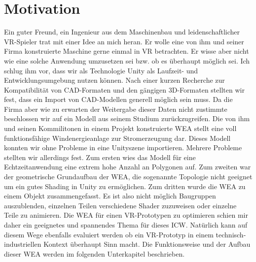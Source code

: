 \section{Motivation}
\label{sec:Motivation}
Ein guter Freund, ein Ingenieur aus dem Maschinenbau und leidenschaftlicher VR-Spieler trat mit einer Idee an mich heran. Er wolle eine von ihm und seiner Firma konstruierte Maschine gerne einmal in VR betrachten. Er wisse aber nicht wie eine solche Anwendung umzusetzen sei bzw. ob es überhaupt möglich sei. Ich schlug ihm vor, dass wir als Technologie Unity als Laufzeit- und Entwicklungsumgebung nutzen können. Nach einer kurzen Recherche  zur Kompatibilität von CAD-Formaten und den gängigen 3D-Formaten stellten wir fest, dass ein Import von CAD-Modellen generell möglich sein muss. Da die Firma aber wie zu erwarten der Weitergabe dieser Daten nicht zustimmte beschlossen wir auf ein Modell aus seinem Studium zurückzugreifen. Die von ihm und seinen Kommilitonen in einem Projekt konstruierte WEA stellt eine voll funktionsfähige Windenergieanlage zur Stromerzeugung dar. Dieses Modell konnten wir ohne Probleme in eine Unityszene importieren. Mehrere Probleme stellten wir allerdings fest. Zum ersten wies das Modell für eine Echtzeitanwendung eine extrem hohe  Anzahl an Polygonen auf. Zum zweiten war der geometrische Grundaufbau der WEA, die sogenannte Topologie nicht geeignet um ein gutes Shading in Unity zu ermöglichen. Zum dritten wurde die WEA zu einem Objekt zusammengefasst. Es ist also nicht möglich Baugruppen auszublenden, einzelnen Teilen verschiedene Shader zuzuweisen oder einzelne Teile zu animieren. Die WEA für einen VR-Prototypen zu optimieren schien mir daher ein geeignetes und spannendes Thema für dieses ICW. Natürlich kann auf diesem Wege ebenfalls evaluiert werden ob ein VR-Prototyp in einem technisch-industriellen Kontext überhaupt Sinn macht.  Die Funktionsweise und der Aufbau dieser WEA werden im folgenden Unterkapitel  beschrieben.

\newpage

